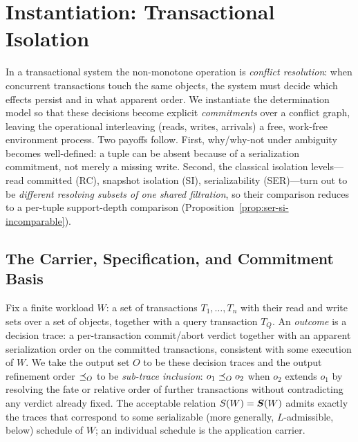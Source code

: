 %
\section{Instantiation: Transactional Isolation}
\label{sec:transactions}

In a transactional system the non-monotone operation is \emph{conflict
resolution}: when concurrent transactions touch the same objects, the system
must decide which effects persist and in what apparent order. We instantiate
the determination model so that these decisions become explicit
\emph{commitments} over a conflict graph, leaving the operational interleaving
(reads, writes, arrivals) a free, work-free environment process. Two payoffs
follow. First, why/why-not under ambiguity becomes well-defined: a tuple can be
absent because of a serialization commitment, not merely a missing write.
Second, the classical isolation levels---read committed (RC), snapshot
isolation (SI), serializability (SER)---turn out to be \emph{different resolving
subsets of one shared filtration}, so their comparison reduces to a per-tuple
support-depth comparison (Proposition~\ref{prop:ser-si-incomparable}).

\subsection{The Carrier, Specification, and Commitment Basis}
\label{sec:txn-setup}

Fix a finite workload $W$: a set of transactions $T_1,\dots,T_n$ with their
read and write sets over a set of objects, together with a query transaction
$T_Q$. An \emph{outcome} is a decision trace: a per-transaction commit/abort
verdict together with an apparent serialization order on the committed
transactions, consistent with some execution of $W$. We take the output set
$O$ to be these decision traces and the output refinement order $\preceq_O$ to be
\emph{sub-trace inclusion}: $o_1 \preceq_O o_2$ when $o_2$ extends $o_1$ by
resolving the fate or relative order of further transactions without
contradicting any verdict already fixed. The acceptable relation
$S(W) = \boldsymbol{S}(W)$ admits exactly the traces that correspond to some
serializable (more generally, $L$-admissible, below) schedule of $W$; an
individual schedule is the application carrier.

